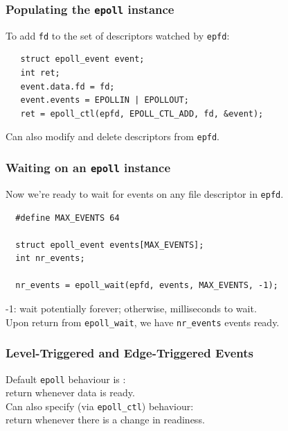 \begin{frame}[fragile]
  \frametitle{Populating the {\tt epoll} instance}
  
    To add {\tt fd} to the set of descriptors watched by {\tt epfd}:
    \begin{lstlisting}
   struct epoll_event event;
   int ret;
   event.data.fd = fd;
   event.events = EPOLLIN | EPOLLOUT;
   ret = epoll_ctl(epfd, EPOLL_CTL_ADD, fd, &event);
    \end{lstlisting}

    Can also modify and delete descriptors from {\tt epfd}.
  
\end{frame}

\begin{frame}[fragile]
  \frametitle{Waiting on an {\tt epoll} instance}
  
    Now we're ready to wait for events on any file descriptor in {\tt epfd}.
    \begin{lstlisting}
  #define MAX_EVENTS 64

  struct epoll_event events[MAX_EVENTS];
  int nr_events;

  nr_events = epoll_wait(epfd, events, MAX_EVENTS, -1);
    \end{lstlisting}

-1: wait potentially forever; otherwise, milliseconds to wait.\\[1em]

Upon return from {\tt epoll\_wait}, we have {\tt nr\_events} events ready.

  
\end{frame}

\begin{frame}
  \frametitle{Level-Triggered and Edge-Triggered Events}
  
    Default {\tt epoll} behaviour is :\\
    \quad return whenever data is ready.\\[1em]

    Can also specify (via {\tt epoll\_ctl})  behaviour:\\
    \quad return whenever there is a change in readiness.\\[1em]
  
\end{frame}


